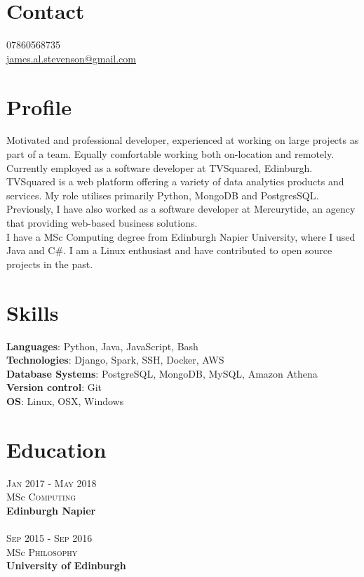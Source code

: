 \documentclass[14pt, a4paper]{extarticle}
\begin{document}
\par{\bigskip\par
\section{Contact}
\large
07860568735\\
\href{mailto:james.al.stevenson@gmail.com}{james.al.stevenson@gmail.com}\\
}

\begin{multicols}{2}

\section{Profile}
\noindent Motivated and professional developer, experienced at working on large projects as part of a team. Equally comfortable working both on-location and remotely.\\
Currently employed as a software developer at TVSquared, Edinburgh. TVSquared is a web platform offering a variety of data analytics products and services. My role utilises primarily Python, MongoDB and PostgresSQL.\\
Previously, I have also worked as a software developer at Mercurytide, an agency that providing web-based business solutions.\\
I have a MSc Computing degree from Edinburgh Napier University, where I used Java and C\#. I am a Linux enthusiast and have contributed to open source projects in the past.

\section{Skills}
\noindent\textbf{Languages}: Python, Java, JavaScript, Bash\\
\textbf{Technologies}: Django, Spark, SSH, Docker, AWS\\
\textbf{Database Systems}: PostgreSQL, MongoDB, MySQL, Amazon Athena\\
\textbf{Version control}: Git\\
\textbf{OS}: Linux, OSX, Windows

\section{Education}
\noindent\textsc{Jan} 2017 - \textsc{May} 2018\\
MSc \textsc{Computing} \\
\textbf{Edinburgh Napier}\\~\\
\textsc{Sep} 2015 - \textsc{Sep} 2016\\
MSc \textsc{Philosophy} \\
\textbf{University of Edinburgh}


\end{multicols}
\end{document}
